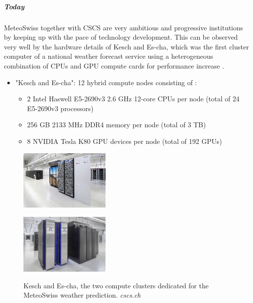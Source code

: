 \subparagraph{Today}
MeteoSwiss together with CSCS are very ambitious and progressive institutions by keeping up with the pace of technology development. This can be observed very well by the hardware details of Kesch and Es-cha, which was the first cluster computer of a national weather forecast service using a heterogeneous combination of CPUs and GPU compute cards for performance increase \cite{label53}. 
\begin{itemize}
	\item "Kesch and Es-cha": 12 hybrid compute nodes consisting of \cite{label54}:
	\begin{itemize}
		\item 2 Intel Haswell E5-2690v3 2.6 GHz 12-core CPUs per node (total of 24 E5-2690v3 processors)
		\item 256 GB 2133 MHz DDR4 memory per node (total of 3 TB)  
		\item 8 NVIDIA Tesla K80 GPU devices per node (total of 192 GPUs)    
	\end{itemize}
\end{itemize}
\begin{figure}[h]
	\begin{minipage}{.5\columnwidth}
		\centering
		\includegraphics[height=8em]{images/meteoswiss-computer1.jpg}
		\label{fig:meteoswiss-computer1}
	\end{minipage}
	\begin{minipage}{.5\columnwidth}
		\centering
		\includegraphics[height=8em]{images/meteoswiss-computer2.jpg}
		\label{fig:meteoswiss-computer2}
	\end{minipage}
	\caption{Kesch and Es-cha, the two compute clusters dedicated for the MeteoSwiss weather prediction. \textit{cscs.ch}}
\end{figure}


